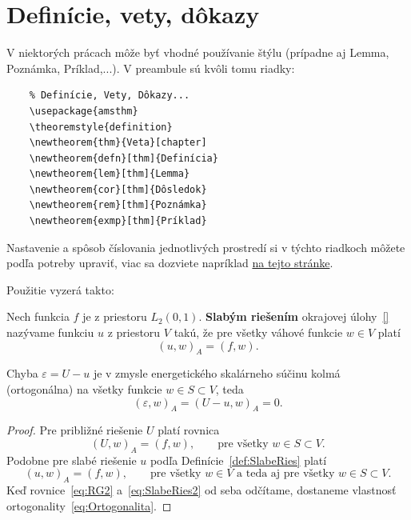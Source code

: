 \section{Definície, vety, dôkazy}
V niektorých prácach môže byť vhodné používanie štýlu  (prípadne aj Lemma, Poznámka, Príklad,...). V preambule sú kvôli tomu riadky:
\begin{verbatim}
	% Definície, Vety, Dôkazy...
	\usepackage{amsthm}
	\theoremstyle{definition}
	\newtheorem{thm}{Veta}[chapter]
	\newtheorem{defn}[thm]{Definícia}
	\newtheorem{lem}[thm]{Lemma}
	\newtheorem{cor}[thm]{Dôsledok}
	\newtheorem{rem}[thm]{Poznámka}
	\newtheorem{exmp}[thm]{Príklad}
\end{verbatim}
Nastavenie a spôsob číslovania jednotlivých prostredí si v týchto riadkoch môžete podľa potreby upraviť, viac sa dozviete napríklad \href{https://www.overleaf.com/learn/latex/Theorems_and_proofs}{na tejto stránke}.

Použitie vyzerá takto:

\begin{defn}\label{def:SlabeRies}
	Nech funkcia $f$ je z priestoru $L_2(0,1)$. \textbf{Slabým riešením} okrajovej úlohy~\eqref{} nazývame funkciu $u$ z priestoru $V$ takú, že pre všetky váhové funkcie $w\in V$ platí
	\begin{equation*}
		(u,w)_A=(f,w).
	\end{equation*}
\end{defn}


\begin{thm}
	Chyba  $\varepsilon=U-u$ je v zmysle energetického skalárneho súčinu kolmá (ortogonálna) na všetky funkcie $w\in S \subset V$, teda
	\begin{equation}\label{eq:Ortogonalita}
		(\varepsilon,w)_A=(U-u,w)_A=0.
	\end{equation}
\end{thm}
\begin{proof}
	Pre približné riešenie $U$ platí rovnica
	\begin{equation}\label{eq:RG2}
		(U,w)_A=(f,w),\qquad \mbox{pre všetky } w \in S\subset V.
	\end{equation}
	Podobne pre slabé riešenie $u$ podľa Definície~\ref{def:SlabeRies} platí
	\begin{equation}\label{eq:SlabeRies2}
		(u,w)_A=(f,w),\qquad \mbox{pre všetky } w \in V \mbox{ a teda aj pre všetky } w \in S\subset V.
	\end{equation}
	Keď rovnice~\eqref{eq:RG2} a~\eqref{eq:SlabeRies2} od seba odčítame, dostaneme vlastnosť ortogonality~\eqref{eq:Ortogonalita}.
\end{proof}

